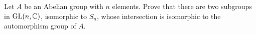 Let $A$ be an Abelian group with $n$ elements. Prove that there are two subgroups in $\text{GL}(n,\Bbb{C})$, isomorphic to $S_n$, whose intersection is isomorphic to the automorphism group of $A$.

